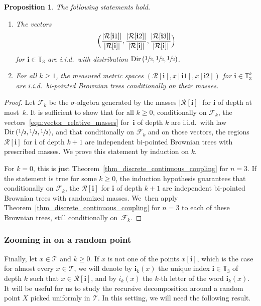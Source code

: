 \documentclass[11pt]{article}
\newenvironment{enumeratei}
{\bgroup\def\theenumi{\roman{enumi}}\def\theenumii{\arabic{enumii}}\begin{enumerate}}
{\end{enumerate}\egroup}
\newcommand{\Tt}{\mathcal{T}}
\newcommand{\Rr}{\mathcal{R}}
\newcommand{\ii}{\mathbf{i}}
\newcommand{\Dir}{\mathrm{Dir}}
\theoremstyle{plain}
\newtheorem{proposition}[theorem]{Proposition}
\theoremstyle{definition}
\numberwithin{equation}{section}
\begin{document}
\begin{proposition}\label{prop_independence_decomposition}
The following statements hold.
\begin{enumeratei}
\item The vectors\vspace*{-3pt}
\begin{equation}\label{eqn:vector_relative_masses}
\Bigl( \frac{\left| \Rr[\ii 1] \right|}{\left| \Rr[\ii ] \right|}, \frac{\left| \Rr[\ii 2] \right|}{\left| \Rr[\ii ] \right|}, \frac{\left| \Rr[\ii 3] \right|}{\left| \Rr[\ii ] \right|} \Bigr)
\end{equation}
for $\ii \in \mathbb{T}_3$ are i.i.d.\ with distribution $\Dir \left( \sfrac12, \sfrac12, \sfrac12 \right)$.
\item For all $k \geq 1$, the measured metric spaces $\left( \Rr[\ii ], x[\ii 1], x[\ii 2] \right)$ for $\ii \in \mathbb{T}_3^k$ are i.i.d.\ bi-pointed Brownian trees conditionally on their masses.
\end{enumeratei}
\end{proposition}

\begin{proof}
Let $\mathcal{F}_k$ be the $\sigma$-algebra generated by the masses $\left| \Rr[\ii ] \right|$ for $\ii$ of depth at most~$k$.
It is sufficient to show that for all $k \geq 0$, conditionally on $\mathcal{F}_k$, the vectors~\eqref{eqn:vector_relative_masses} for~$\ii $ of depth $k$ are i.i.d.\ with law $\Dir \left( \sfrac12, \sfrac12, \sfrac12 \right)$, and that conditionally on $\mathcal{F}_k$ and on those vectors, the regions $\Rr[\ii ]$ for $\ii $ of depth $k+1$ are independent bi-pointed Brownian trees with prescribed masses.
We prove this statement by induction on $k$.

For $k=0$, this is just Theorem~\ref{thm_discrete_continuous_coupling} for $n=3$. If the statement is true for some $k \geq 0$, the induction hypothesis guarantees that conditionally on $\mathcal{F}_k$, the $\Rr[\ii ]$ for $\ii $ of depth $k+1$ are independent bi-pointed Brownian trees with randomized masses. We~then apply Theorem~\ref{thm_discrete_continuous_coupling} for $n=3$ to each of these Brownian trees, still conditionally on~$\mathcal{F}_k$.
\end{proof}

\subsubsection*{Zooming in on a random point}
Finally, let $x \in \Tt$ and $k \geq 0$.
If $x$ is not one of the points $x[\ii]$, which is the case for almost every $x \in \Tt$, we will denote by $\ii_k(x)$ the unique index $\ii \in \mathbb{T}_3$ of depth $k$ such that $x \in \Rr[\ii ]$, and by $i_k(x)$ the $k$-th letter of the word $\ii _k(x)$.
It will be useful for us to study the recursive decomposition around a random point $X$ picked uniformly in $\Tt$.
In this setting, we will need the following result.
\end{document}
